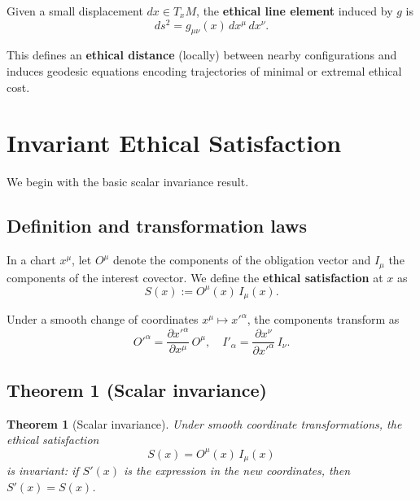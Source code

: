 \documentclass[12pt]{article}
\newtheorem{theorem}{Theorem}
\theoremstyle{remark}
\begin{document}
Given a small displacement $dx \in T_x M$, the \textbf{ethical line element} induced by $g$ is
\begin{equation}
    ds^2 = g_{\mu\nu}(x)\, dx^\mu\, dx^\nu.
\end{equation}

This defines an \textbf{ethical distance} (locally) between nearby configurations and induces geodesic equations encoding trajectories of minimal or extremal ethical cost.

\section{Invariant Ethical Satisfaction}

We begin with the basic scalar invariance result.

\subsection{Definition and transformation laws}

In a chart $x^\mu$, let $O^\mu$ denote the components of the obligation vector and $I_\mu$ the components of the interest covector. We define the \textbf{ethical satisfaction} at $x$ as
\begin{equation}
    S(x) := O^\mu(x)\, I_\mu(x).
\end{equation}

Under a smooth change of coordinates $x^\mu \mapsto x'^\alpha$, the components transform as
\begin{equation}
    O'^{\alpha} = \frac{\partial x'^{\alpha}}{\partial x^{\mu}}\, O^{\mu},\quad
    I'_{\alpha} = \frac{\partial x^{\nu}}{\partial x'^{\alpha}}\, I_{\nu}.
\end{equation}

\subsection{Theorem 1 (Scalar invariance)}

\begin{theorem}[Scalar invariance]
Under smooth coordinate transformations, the ethical satisfaction
\begin{equation}
    S(x) = O^\mu(x)\, I_\mu(x)
\end{equation}
is invariant: if $S'(x)$ is the expression in the new coordinates, then $S'(x) = S(x)$.
\end{theorem}
\end{document}
